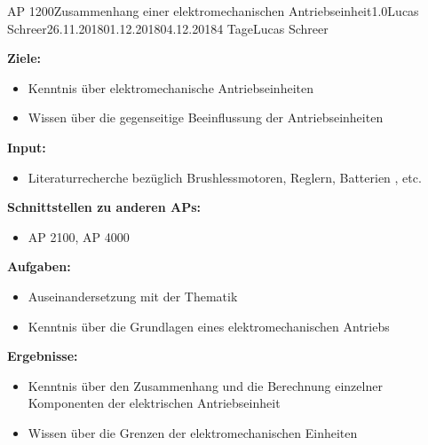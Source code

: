 \clearpage
\begin{wpd}{AP 1200}{Zusammenhang einer elektromechanischen Antriebseinheit}{1.0}{Lucas Schreer}{26.11.2018}{01.12.2018}{04.12.2018}{4 Tage}{Lucas Schreer}
    {
    \textbf{Ziele:}
    \begin{itemize}
        \item Kenntnis über elektromechanische Antriebseinheiten
        \item Wissen über die gegenseitige Beeinflussung der Antriebseinheiten
    \end{itemize}
    \textbf{Input:}
    \begin{itemize}
        \item Literaturrecherche bezüglich Brushlessmotoren, Reglern, Batterien , etc.
    \end{itemize}
    \textbf{Schnittstellen zu anderen APs:}
    \begin{itemize}
        \item AP 2100, AP 4000
    \end{itemize}
    \textbf{Aufgaben:}
    \begin{itemize}
        \item Auseinandersetzung mit der Thematik 
        \item Kenntnis über die Grundlagen eines elektromechanischen Antriebs        
    \end{itemize}
    \textbf{Ergebnisse:}
    \begin{itemize}
        \item Kenntnis über den Zusammenhang und die Berechnung einzelner Komponenten der elektrischen Antriebseinheit
        \item Wissen über die Grenzen der elektromechanischen Einheiten
    \end{itemize}
    }
\end{wpd}


